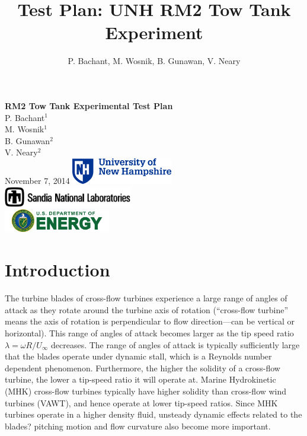 \documentclass[12pt]{report}
\author{P. Bachant, M. Wosnik, B. Gunawan, V. Neary}
\title{Test Plan: UNH RM2 Tow Tank Experiment}
\begin{document}
\begin{titlepage}
    \centering
    \vfill
    {\bfseries\Large
        RM2 Tow Tank Experimental Test Plan\\
    }  
            \vskip2cm
            P. Bachant$^1$\\
            M. Wosnik$^1$\\
            B. Gunawan$^2$\\
            V. Neary$^2$\\  
    \vfill
    November 7, 2014
    \vfill
    \includegraphics[width=0.33\textwidth]{figures/unhlogo} \\
    \vspace{0.1in}
    \includegraphics[width=0.42\textwidth]{figures/snllogo} \\
    \vspace{0.1in}
    \includegraphics[width=0.35\textwidth]{figures/doelogo}
    \vfill
    \vfill
\end{titlepage}

\tableofcontents

\chapter{Introduction}

The turbine blades of cross-flow turbines experience a large range of angles of
attack as they rotate around the turbine axis of rotation (``cross-flow
turbine'' means the axis of rotation is perpendicular to flow direction---can be
vertical or horizontal).  This range of angles of attack becomes larger as the
tip speed ratio $\lambda=\omega R/U_\infty$  decreases.  The range of angles of
attack is typically sufficiently large that the blades operate under dynamic
stall, which is a Reynolds number dependent phenomenon. Furthermore, the higher
the solidity of a cross-flow turbine, the lower a tip-speed ratio it will
operate at. Marine Hydrokinetic (MHK) cross-flow turbines typically have higher
solidity than cross-flow wind turbines (VAWT), and hence operate at lower
tip-speed ratios. Since MHK turbines operate in a higher density fluid, unsteady
dynamic effects related to the blades? pitching motion and flow curvature also
become more important.
\end{document}
